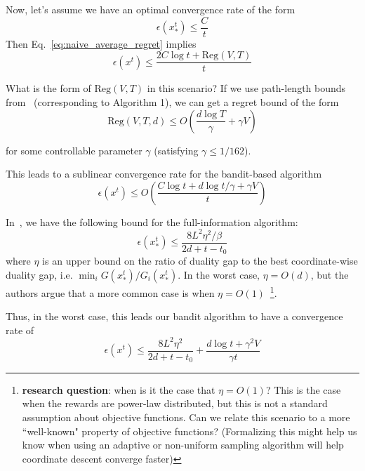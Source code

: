 \documentclass[letterpaper]{article}
\begin{document}
Now, let's assume we have an optimal convergence rate of the form
\begin{equation}
    \epsilon(x^t_*) \leq \frac{C}{t}
\end{equation}
Then Eq.~\ref{eq:naive_average_regret} implies
\begin{equation}
    \epsilon(x^t) \leq \frac{2C\log t + \text{Reg}(V,T)}{t}
\end{equation}

What is the form of $\text{Reg}(V,T)$ in this scenario? If we use path-length bounds from~\cite{bubeck2019improved} (corresponding to Algorithm 1), we can get a regret bound of the form
\begin{equation}
    \text{Reg}(V, T, d) \leq O\left( \frac{d \log T}{\gamma} + \gamma V\right)
\end{equation}

for some controllable parameter $\gamma$ (satisfying $\gamma \leq 1/162$).

This leads to a sublinear convergence rate for the bandit-based algorithm
\begin{equation}
    \epsilon(x^t) \leq O\left(\frac{C \log t + d \log t / \gamma + \gamma V}{t}\right)
\end{equation}

In~\cite{salehi2018coordinate}, we have the following bound for the full-information algorithm:
\begin{equation}
    \epsilon(x_*^t) \leq \frac{8L^2 \eta^2 / \beta}{2d + t - t_0}
\end{equation}
where $\eta$ is an upper bound on the ratio of duality gap to the best coordinate-wise duality gap, i.e. $\min_i G(x^t_*)/G_i(x^t_*)$. In the worst case, $\eta = O(d)$, but the authors argue that a more common case is when $\eta = O(1)$~\cite{salehi2018coordinate}\footnote{\textbf{research question}: when is it the case that $\eta = O(1)$? This is the case when the rewards are power-law distributed, but this is not a standard assumption about objective functions. Can we relate this scenario to a more ``well-known" property of objective functions? (Formalizing this might help us know when using an adaptive or non-uniform sampling algorithm will help coordinate descent converge faster)}.

Thus, in the worst case, this leads our bandit algorithm to have a convergence rate of
\begin{equation}
    \epsilon(x^t) \leq \frac{8L^2 \eta^2}{2d+t-t_0} + \frac{d \log t + \gamma^2 V}{\gamma t}
    \label{eq:naive_convergence_rate}
\end{equation}
\end{document}
